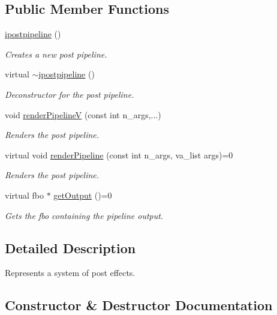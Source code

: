 \subsection*{Public Member Functions}
\begin{DoxyCompactItemize}
\item 
\hyperlink{classflounder_1_1ipostpipeline_a778c68518cfcdf1de4052264538b28d3}{ipostpipeline} ()
\begin{DoxyCompactList}\small\item\em Creates a new post pipeline. \end{DoxyCompactList}\item 
virtual \hyperlink{classflounder_1_1ipostpipeline_a82ab1aded690131f211c5627c54f2c4c}{$\sim$ipostpipeline} ()
\begin{DoxyCompactList}\small\item\em Deconstructor for the post pipeline. \end{DoxyCompactList}\item 
void \hyperlink{classflounder_1_1ipostpipeline_adb857f2d31022074ed6543f42b6b4c8f}{render\+PipelineV} (const int n\+\_\+args,...)
\begin{DoxyCompactList}\small\item\em Renders the post pipeline. \end{DoxyCompactList}\item 
virtual void \hyperlink{classflounder_1_1ipostpipeline_a25255482fdb75f92b8c3f940ca8c583a}{render\+Pipeline} (const int n\+\_\+args, va\+\_\+list args)=0
\begin{DoxyCompactList}\small\item\em Renders the post pipeline. \end{DoxyCompactList}\item 
virtual fbo $\ast$ \hyperlink{classflounder_1_1ipostpipeline_a08f5d19b9652528337b73c2f4e0e4258}{get\+Output} ()=0
\begin{DoxyCompactList}\small\item\em Gets the fbo containing the pipeline output. \end{DoxyCompactList}\end{DoxyCompactItemize}


\subsection{Detailed Description}
Represents a system of post effects. 



\subsection{Constructor \& Destructor Documentation}
\mbox{\label{classflounder_1_1ipostpipeline_a778c68518cfcdf1de4052264538b28d3}} 
